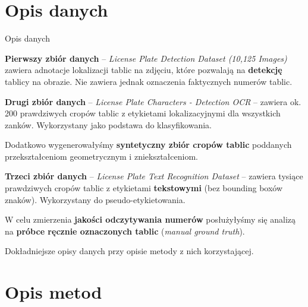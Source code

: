 \documentclass{beamer}
\begin{document}
\section{Opis danych}


\begin{frame}{Opis danych}

\textbf{Pierwszy zbiór danych} -- \textit{License Plate Detection Dataset (10,125 Images)} zawiera adnotacje lokalizacji tablic na zdjęciu, które pozwalają na \textbf{detekcję} tablicy na obrazie. Nie zawiera jednak oznaczenia faktycznych numerów tablic.

\vspace{0.2cm}

\textbf{Drugi zbiór danych} -- \textit{License Plate Characters - Detection OCR} -- zawiera ok. 200 prawdziwych cropów tablic z etykietami lokalizacyjnymi dla wszystkich zanków. Wykorzystany jako podstawa do klasyfikowania.

\vspace{0.2cm}

Dodatkowo wygenerowałyśmy \textbf{syntetyczny zbiór cropów tablic} poddanych przekształceniom geometrycznym i zniekształceniom.

\vspace{0.2cm}

\textbf{Trzeci zbiór danych} -- \textit{License Plate Text Recognition Dataset} -- zawiera tysiące prawdziwych cropów tablic z etykietami \textbf{tekstowymi} (bez bounding boxów znaków). Wykorzystany do pseudo-etykietowania.

\vspace{0.2cm}

W celu zmierzenia \textbf{jakości odczytywania numerów} posłużyłyśmy się
analizą na \textbf{próbce ręcznie oznaczonych tablic} (\emph{manual ground truth}).

\vspace{0.2cm}

\scriptsize
Dokładniejsze opisy danych przy opisie metody z nich korzystającej.

\end{frame}



\section{Opis metod}
\end{document}
